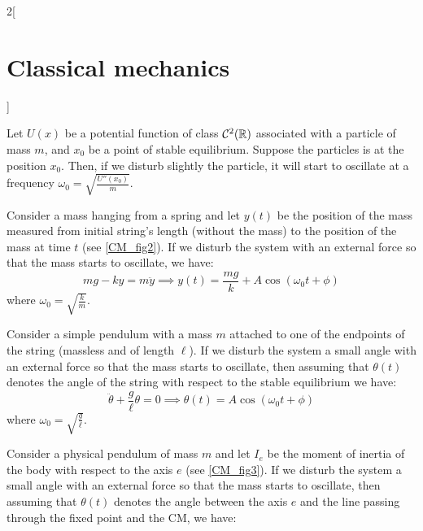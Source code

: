 \documentclass[../../../main.tex]{subfiles}
\begin{document}
\begin{multicols}{2}[\section{Classical mechanics}]
\begin{definition}
  \end{definition}
  \begin{proposition}
    Let $U(x)$ be a potential function of class $\mathcal{C}^2(\mathbb{R})$ associated with a particle of mass $m$, and $x_0$ be a point of stable equilibrium. Suppose the particles is at the position $x_0$. Then, if we disturb slightly the particle, it will start to oscillate at a frequency $\omega_0=\sqrt{\frac{U''(x_0)}{m}}$.
  \end{proposition}
  \begin{proposition}
    Consider a mass hanging from a spring and let $y(t)$ be the position of the mass measured from initial string's length (without the mass) to the position of the mass at time $t$ (see \cref{CM_fig2}). If we disturb the system with an external force so that the mass starts to oscillate, we have: $$mg-ky=m\ddot{y}\implies y(t)=\frac{mg}{k}+A\cos(\omega_0t+\phi)$$ where $\omega_0=\sqrt{\frac{k}{m}}$.
    \begin{center}
      \begin{minipage}{\linewidth}
        \centering
        
        \label{CM_fig2}
      \end{minipage}
    \end{center}
  \end{proposition}
  \begin{proposition}
    Consider a simple pendulum with a mass $m$ attached to one of the endpoints of the string (massless and of length $\ell$). If we disturb the system a small angle with an external force so that the mass starts to oscillate, then assuming that $\theta(t)$ denotes the angle of the string with respect to the stable equilibrium we have:
    $$\ddot{\theta}+\frac{g}{\ell}\theta=0\implies\theta(t)=A\cos(\omega_0t+\phi)$$ where $\omega_0=\sqrt{\frac{g}{\ell}}$.
    \begin{center}
      \begin{minipage}{\linewidth}
        \centering
        
      \end{minipage}
    \end{center}
  \end{proposition}
  \begin{proposition}
    Consider a physical pendulum of mass $m$ and let $I_e$ be the moment of inertia of the body with respect to the axis $e$ (see \cref{CM_fig3}). If we disturb the system a small angle with an external force so that the mass starts to oscillate, then assuming that $\theta(t)$ denotes the angle between the axis $e$ and the line passing through the fixed point and the CM, we have:

\end{proposition}
\end{multicols}
\end{document}
